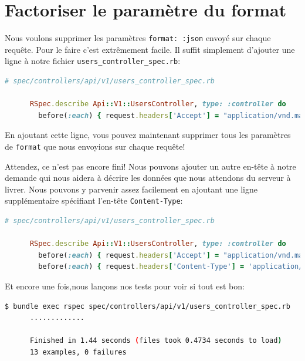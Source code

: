 \documentclass[]{report}
\begin{document}
  \section{Factoriser le paramètre du format}

    Nous voulons supprimer les paramètres \verb|format: :json| envoyé sur chaque requête. Pour le faire c'est extrêmement facile. Il suffit simplement d'ajouter une ligne à notre fichier \verb|users_controller_spec.rb|:

    \begin{scriptsize}
      \begin{lstlisting}[language=ruby]
      # spec/controllers/api/v1/users_controller_spec.rb

      RSpec.describe Api::V1::UsersController, type: :controller do
        before(:each) { request.headers['Accept'] = "application/vnd.marketplace.v1, application/json" }
      \end{lstlisting}
    \end{scriptsize}

    En ajoutant cette ligne, vous pouvez maintenant supprimer tous les paramètres de \verb|format| que nous envoyions sur chaque requête!

    Attendez, ce n'est pas encore fini! Nous pouvons ajouter un autre en-tête à notre demande qui nous aidera à décrire les données que nous attendons du serveur à livrer. Nous pouvons y parvenir assez facilement en ajoutant une ligne supplémentaire spécifiant l'en-tête \verb|Content-Type|:

    \begin{scriptsize}
      \begin{lstlisting}[language=ruby]
      # spec/controllers/api/v1/users_controller_spec.rb

      RSpec.describe Api::V1::UsersController, type: :controller do
        before(:each) { request.headers['Accept'] = "application/vnd.marketplace.v1, application/json" }
        before(:each) { request.headers['Content-Type'] = 'application/json' }
      \end{lstlisting}
    \end{scriptsize}

    Et encore une fois,nous lançons nos tests pour voir si tout est bon:

    \begin{scriptsize}
      \begin{lstlisting}[language=bash]
      $ bundle exec rspec spec/controllers/api/v1/users_controller_spec.rb
      .............

      Finished in 1.44 seconds (files took 0.4734 seconds to load)
      13 examples, 0 failures
      \end{lstlisting}
    \end{scriptsize}
\end{document}

